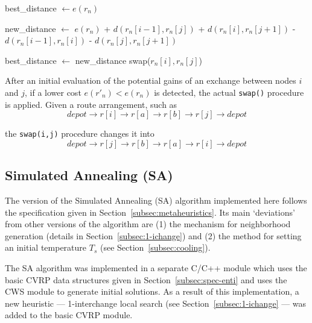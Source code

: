 \begin{algorithmic}[1]

    \State best\_distance $ \leftarrow e(r_n)$ 



            \State new\_distance $ \leftarrow $
            \Statex[4] $e(r_n)$ 
            \Statex[4] + $d(r_n[i - 1], r_n[j])$ 
            \Statex[4] + $d(r_n[i], r_n[j + 1])$ 
            \Statex[4] - $d(r_n[i - 1], r_n[i])$ 
            \Statex[4] - $d(r_n[j], r_n[j + 1])$


                \State best\_distance $ \leftarrow $ new\_distance
                \State swap($r_n[i],r_n[j]$)
            \EndIf

        \EndFor

    \EndFor

\EndFor
\end{algorithmic}\vertbreak

After an initial evaluation of the potential gains of an exchange between 
nodes $i$ and $j$, if a lower cost $e(r'_n) < e(r_n)$ is detected, the 
actual \verb?swap()? procedure is applied. Given a route arrangement, such as 
\[ depot \rightarrow r[i] \rightarrow r[a] \rightarrow r[b] \rightarrow r[j] \rightarrow depot \] 

the \verb?swap(i,j)? procedure changes it into 
\[ depot \rightarrow r[j] \rightarrow r[b] \rightarrow r[a] \rightarrow r[i] \rightarrow depot \] 

\subsection{Simulated Annealing (SA)}
\label{subsec:sa}

The version of the Simulated Annealing (SA) algorithm implemented here follows 
the specification given in Section~\ref{subsec:metaheuristics}. Its main 
`deviations' from other versions of the algorithm are (1) the mechanism for 
neighborhood generation (details in Section~\ref{subsec:1-ichange}) and (2) the 
method for setting an initial temperature $T_s$ (see 
Section~\ref{subsec:cooling}).\vertbreak

The SA algorithm was implemented in a separate C\slash C++ module which uses 
the basic CVRP data structures given in Section~\ref{subsec:spec-enti} and uses 
the CWS module to generate initial solutions. As a result of this 
implementation, a new heuristic --- 1-interchange local search (see 
Section~\ref{subsec:1-ichange} --- was added to the basic CVRP module.

